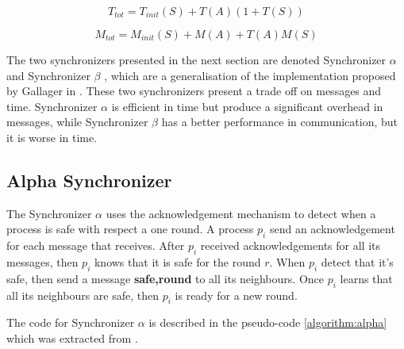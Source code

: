 \begin{equation}
\label{ec:mess}
 T_{tot} = T_{init}(S) + T(A)(1+T(S)) 
\end{equation}

\begin{equation}
\label{ec:time}
M_{tot} = M_{init}(S) + M(A) + T(A)M(S) 
\end{equation}


The two synchronizers presented in the next section are denoted Synchronizer $\alpha$ and Synchronizer $\beta$ \cite{awerbuch1985complexity}, which are a generalisation of the implementation proposed by Gallager in \cite{gallager1982distributed}. These two synchronizers present a trade off on messages and time. Synchronizer $\alpha$ is efficient in time but produce a significant overhead in messages, while Synchronizer $\beta$ has a better performance in communication, but it is worse in time.



\subsection{Alpha Synchronizer}

The Synchronizer $\alpha$ uses the acknowledgement mechanism to detect when a process is safe with respect a one round. A process $p_i$ send an acknowledgement for each message that receives. After $p_i$ received acknowledgements for all its messages, then $p_i$ knows that it is safe for the round $r$. When $p_i$ detect that it's safe, then send a message \textbf{safe,round} to all its neighbours. Once $p_i$ learns that all its neighbours are safe, then $p_i$ is ready for a new round.

The code for Synchronizer $\alpha$ is described in the pseudo-code \ref{algorithm:alpha} which was extracted from \cite{attiya2004distributed}.  

